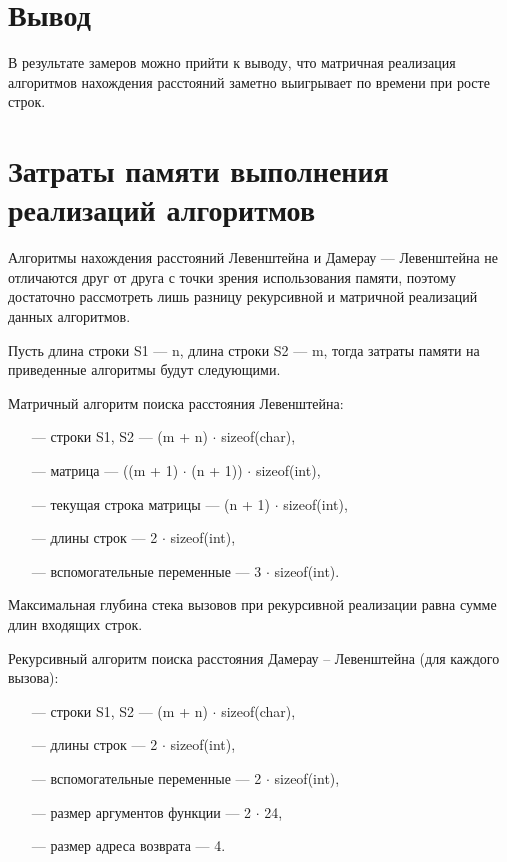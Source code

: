\section*{Вывод}

В результате замеров можно прийти к выводу, что матричная реализация алгоритмов нахождения расстояний заметно выигрывает по времени при росте строк.

\section{Затраты памяти выполнения реализаций алгоритмов}

Алгоритмы нахождения расстояний Левенштейна и Дамерау --- Левенштейна не отличаются друг от друга с точки зрения использования памяти, поэтому достаточно рассмотреть лишь разницу рекурсивной и матричной реализаций данных алгоритмов.

Пусть длина строки S1 --- n, длина строки S2 --- m, тогда затраты памяти на приведенные  алгоритмы будут следующими.

Матричный алгоритм поиска расстояния Левенштейна:
\begin{itemize}
    \item[---] строки S1, S2 --- (m + n) $\cdot$ sizeof(char),
    \item[---] матрица --- ((m + 1) $\cdot$ (n + 1)) $\cdot$ sizeof(int),
    \item[---] текущая строка матрицы --- (n + 1) $\cdot$ sizeof(int),
    \item[---] длины строк --- 2 $\cdot$ sizeof(int),
    \item[---] вспомогательные переменные ---  3 $\cdot$ sizeof(int).
\end{itemize}

Максимальная глубина стека вызовов при рекурсивной реализации равна сумме длин входящих строк.

Рекурсивный алгоритм поиска расстояния Дамерау -- Левенштейна (для каждого вызова):
\begin{itemize}
    \item[---] строки S1, S2 --- (m + n) $\cdot$ sizeof(char),
    \item[---] длины строк --- 2 $\cdot$ sizeof(int),
    \item[---] вспомогательные переменные ---  2 $\cdot$ sizeof(int),
    \item[---] размер аргументов функции --- 2 $\cdot$ 24,
    \item[---] размер адреса возврата --- 4.
\end{itemize}


